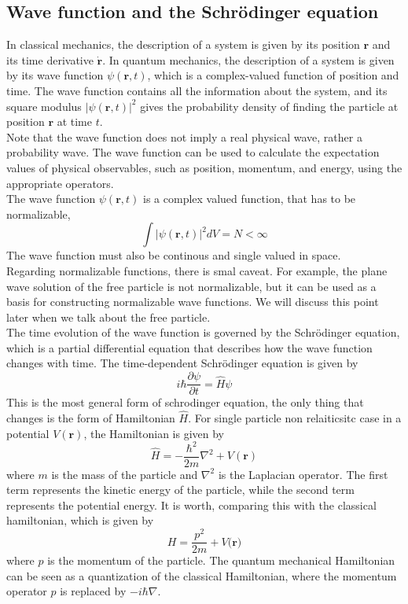 \documentclass{article}
\begin{document}
\subsection{Wave function and the Schrödinger equation}
In classical mechanics, the description of a system is given by its position $\mathbf{r}$ and its time derivative $\mathbf{\dot{r}}$. In quantum mechanics, the description of a system is given by its wave function $\psi(\mathbf{r},t)$, which is a complex-valued function of position and time. The wave function contains all the information about the system, and its square modulus $|\psi(\mathbf{r},t)|^2$ gives the probability density of finding the particle at position $\mathbf{r}$ at time $t$.
\\ Note that the wave function does not imply a real physical wave, rather a probability wave. The wave function can be used to calculate the expectation values of physical observables, such as position, momentum, and energy, using the appropriate operators.
\\
The wave function $\psi (\mathbf{r},t)$ is a complex valued function, that has to be normalizable,
\[
\int |\psi (\mathbf{r},t)|^2 dV = N < \infty
\]
The wave function must also be continous and single valued in space. 
\\Regarding normalizable functions, there is smal caveat. For example, the plane wave solution of the free particle is not normalizable, but it can be used as a basis for constructing normalizable wave functions.
We will discuss this point later when we talk about the free particle.\\
The time evolution of the wave function is governed by the Schrödinger equation, which is a partial differential equation that describes how the wave function changes with time. The time-dependent Schrödinger equation is given by
\[
i\hbar\frac{\partial \psi }{\partial t}=\hat H \psi  
\]
This is the most general form of schrodinger equation, the only thing that changes is the form of Hamiltonian $\hat H $.
For single particle non relaiticsitc case in a potential $V(\mathbf{r})$, the Hamiltonian is given by
\[\hat H = -\frac{\hbar^2}{2m}\nabla^2 + V(\mathbf{r})\]
where $m$ is the mass of the particle and $\nabla^2$ is the Laplacian operator. The first term represents the kinetic energy of the particle, while the second term represents the potential energy.
It is worth, comparing this with the classical hamiltonian, which is given by
\[H = \frac{p^2}{2m} + V(\mathbf{r)}\]
where $p$ is the momentum of the particle. The quantum mechanical Hamiltonian can be seen as a quantization of the classical Hamiltonian, where the momentum operator $\hat p$ is replaced by $-i\hbar\nabla$.
\end{document}
